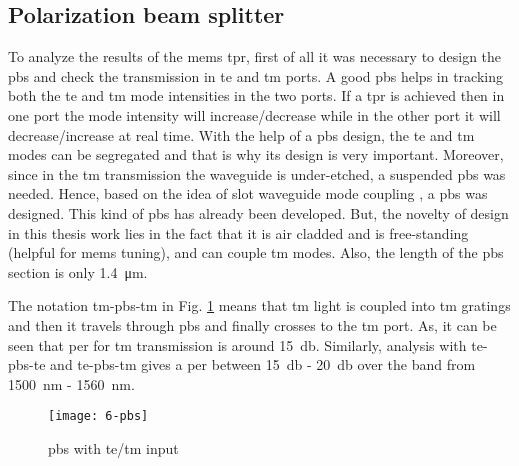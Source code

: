 \documentclass[../report.tex]{subfiles}
\begin{document}
	\subsection{Polarization beam splitter}
	To analyze the results of the \gls{mems} \gls{tpr}, first of all it was necessary to design the \gls{pbs} and check the transmission in \gls{te} and \gls{tm} ports. A good \gls{pbs} helps in tracking both the \gls{te} and \gls{tm} mode intensities in the two ports. If a \gls{tpr} is achieved then in one port the mode intensity will increase/decrease while in the other port it will decrease/increase at real time. With the help of a \gls{pbs} design, the \gls{te} and \gls{tm} modes can be segregated and that is why its design is very important. Moreover, since in the \gls{tm} transmission the waveguide is under-etched, a suspended \gls{pbs} was needed. Hence, based on the idea of slot waveguide mode coupling \cite{pbs_dai_2011}, a \gls{pbs} was designed. This kind of \gls{pbs} has already been developed. But, the novelty of design in this thesis work lies in the fact that it is air cladded and is free-standing (helpful for \gls{mems} tuning), and can couple \gls{tm} modes. Also, the length of the \gls{pbs} section is only \SI{1.4}{\micro \meter}.\par
	The notation \gls{tm}-\gls{pbs}-\gls{tm} in Fig. \ref{fig:6_pbs} means that \gls{tm} light is coupled into \gls{tm} gratings and then it travels through \gls{pbs} and finally crosses to the \gls{tm} port. As, it can be seen that \gls{per} for \gls{tm} transmission is around \SI{15}{\decibel}. Similarly, analysis with \gls{te}-\gls{pbs}-\gls{te} and \gls{te}-\gls{pbs}-\gls{tm} gives a \gls{per} between \SI{15}{\decibel} - \SI{20}{\decibel} over the band from \SI{1500}{\nano \meter} - \SI{1560}{\nano \meter}. 
	
	\begin{figure}[H] %
		\centering
		\texttt{[image: 6-pbs]}
		\caption{\gls{pbs} with \gls{te}/\gls{tm} input}
		\label{fig:6_pbs}
	\end{figure}
	
\end{document}
